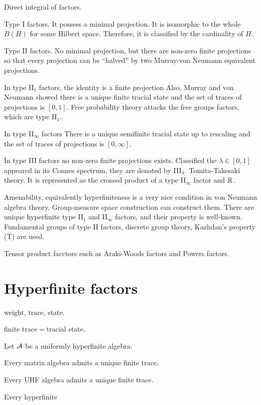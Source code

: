 \documentclass{../../large}
\begin{document}
Direct integral of factors.

Type I factors.
It possess a minimal projection.
It is isomorphic to the whole $B(H)$ for some Hilbert space.
Therefore, it is classified by the cardinality of $H$.

Type II factors.
No minimal projection, but there are non-zero finite projections so that every projection can be ``halved'' by two Murray-von Neumann equivalent projections.

In type II$_1$ factors, the identity is a finite projection
Also, Murray and von Neumann showed there is a unique finite tracial state and the set of traces of projections is $[0,1]$.
Free probability theory attacks the free groups factors, which are type II$_1$.

In type II$_\infty$ factors
There is a unique semifinite tracial state up to rescaling and the set of traces of projections is $[0,\infty]$.

In type III factors no non-zero finite projections exists.
Classified the $\lambda\in[0,1]$ appeared in its Connes spectrum, they are denoted by III$_\lambda$.
Tomita-Takesaki theory.
It is represented as the crossed product of a type II$_\infty$ factor and $\mathbb{R}$.

Amenability, equivalently hyperfiniteness is a very nice condition in von Neumann algebra theory.
Group-measure space construction can construct them.
There are unique hyperfinite type II$_1$ and II$_\infty$ factors, and their property is well-known.
Fundamental groups of type II factors, discrete group theory, Kazhdan's property (T) are used.


Tensor product facctors such as Araki-Woods factors and Powers factors.

\section{Hyperfinite factors}

weight, trace, state.

finite trace$=$tracial state.

\begin{prb}
Let $\mathcal{A}$ be a uniformly hyperfinite algebra.
\begin{parts}
\item Every matrix algebra admits a unique finite trace.
\item Every UHF algebra admits a unique finite trace.
\item Every hyperfinite 
\end{parts}
\end{prb}
\end{document}
